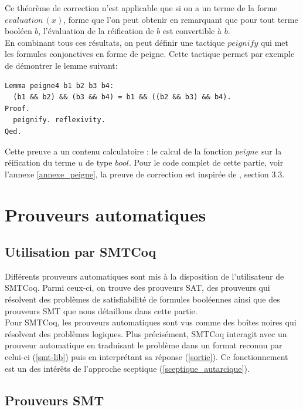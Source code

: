 \documentclass[11pt]{article}
\begin{document}
Ce théorème de correction n'est applicable que si on a un terme de la forme $evaluation \, (x)$, forme que l'on peut obtenir en remarquant que pour tout terme booléen $b$, l'évaluation de la réification de $b$ est convertible à $b$.\\

En combinant tous ces résultats, on peut définir une tactique $peignify$ qui met les formules conjonctives en forme de peigne. Cette tactique permet par exemple de démontrer le lemme suivant: 

\begin{lstlisting}[frame=single]
Lemma peigne4 b1 b2 b3 b4:
  (b1 && b2) && (b3 && b4) = b1 && ((b2 && b3) && b4).
Proof.
  peignify. reflexivity.
Qed.
\end{lstlisting}
Cette preuve a un contenu calculatoire : le calcul de la fonction $peigne$ sur la réification du terme $u$ de type $bool$. Pour le code complet de cette partie, voir l'annexe \ref{annexe_peigne}, la preuve de correction est inspirée de \cite{coq_intro}, section 3.3.


\newpage
\section{Prouveurs automatiques} \label{fonctionnement_prouveurs}

\subsection{Utilisation par SMTCoq}

Différents prouveurs automatiques sont mis à la disposition de l'utilisateur de SMTCoq. Parmi ceux-ci, on trouve des prouveurs SAT, des prouveurs qui résolvent des problèmes de satisfiabilité de formules booléennes ainsi que des prouveurs SMT que nous détaillons dans cette partie. \\ 

Pour SMTCoq, les prouveurs automatiques sont vus comme des boîtes noires qui résolvent des problèmes logiques. Plus précisément, SMTCoq interagit avec un prouveur automatique en traduisant le problème dans un format reconnu par celui-ci (\ref{smt-lib}) puis en interprétant sa réponse (\ref{sortie}). Ce fonctionnement est un des intérêts de l'approche sceptique (\ref{sceptique_autarcique}).

\subsection{Prouveurs SMT} \label{smt}
\end{document}

